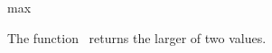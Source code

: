 \begin{ccRefFunction}{max}

\ccDefinition

The function \ccRefName\ returns the larger of two values.


{}

\end{ccRefFunction}
